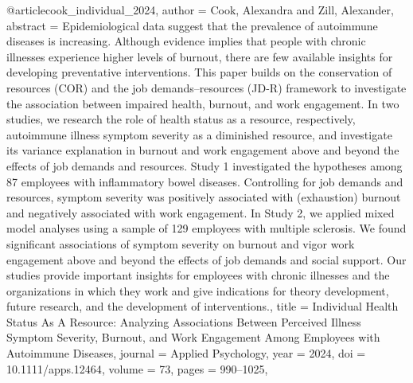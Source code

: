 @article{cook_individual_2024,
  author = {Cook, Alexandra and Zill, Alexander},
  abstract = {Epidemiological data suggest that the prevalence of autoimmune diseases is increasing. Although evidence implies that people with chronic illnesses experience higher levels of burnout, there are few available insights for developing preventative interventions. This paper builds on the conservation of resources (COR) and the job demands–resources (JD-R) framework to investigate the association between impaired health, burnout, and work engagement. In two studies, we research the role of health status as a resource, respectively, autoimmune illness symptom severity as a diminished resource, and investigate its variance explanation in burnout and work engagement above and beyond the effects of job demands and resources. Study 1 investigated the hypotheses among 87 employees with inflammatory bowel diseases. Controlling for job demands and resources, symptom severity was positively associated with (exhaustion) burnout and negatively associated with work engagement. In Study 2, we applied mixed model analyses using a sample of 129 employees with multiple sclerosis. We found significant associations of symptom severity on burnout and vigor work engagement above and beyond the effects of job demands and social support. Our studies provide important insights for employees with chronic illnesses and the organizations in which they work and give indications for theory development, future research, and the development of interventions.},
  title = {{Individual} {Health} {Status} {As} {A} {Resource}: {Analyzing} {Associations} {Between} {Perceived} {Illness} {Symptom} {Severity}, {Burnout}, {and} {Work} {Engagement} {Among} {Employees} {with} {Autoimmune} {Diseases}},
  journal = {Applied Psychology},
  year = {2024},
  doi = {10.1111/apps.12464},
  volume = {73},
  pages = {990--1025},
}

